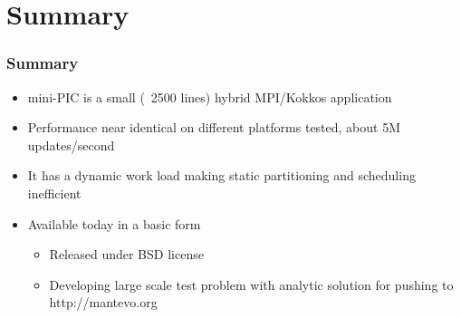 \documentclass[t]{beamer}
\begin{document}
\section{Summary}
\begin{frame}
\frametitle{Summary}
\begin{itemize}
\item mini-PIC is a small (~2500 lines) hybrid MPI/Kokkos application 
\item Performance near identical on different platforms tested, about
  5M updates/second
\item It has a dynamic work load making static partitioning and
  scheduling inefficient
\item Available today in a basic form
\begin{itemize}
\item Released under BSD license
\item Developing large scale test problem with analytic solution for
  pushing to http://mantevo.org
\end{itemize}
\end{itemize}
\end{frame}
\end{document}
